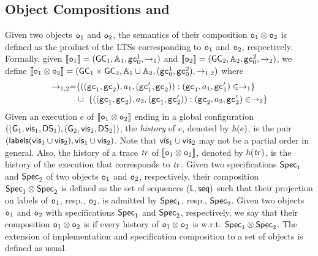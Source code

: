 \subsection{Object Compositions and \CRDTLin{}}

Given two objects $\mathtt{o}_1$ and $\mathtt{o}_2$, the semantics of their composition $\mathtt{o}_1\otimes \mathtt{o}_2$ is defined as the product of the LTSs corresponding to $\mathtt{o}_1$ and $\mathtt{o}_2$, respectively. Formally, given $\llbracket \mathtt{o}_1 \rrbracket =(\mathsf{GC}_1,\mathbb{A}_1,\mathtt{gc}_0^1,\rightarrow_1)$ and $\llbracket \mathtt{o}_2 \rrbracket =(\mathsf{GC}_2,\mathbb{A}_2,\mathtt{gc}_0^2,\rightarrow_2)$, we define $\llbracket \mathtt{o}_1\otimes \mathtt{o}_2 \rrbracket =(\mathsf{GC}_1\times \mathsf{GC}_2,\mathbb{A}_1\cup \mathbb{A}_2,(\mathtt{gc}_0^1,\mathtt{gc}_0^2),\rightarrow_{1,2})$ where 
\begin{align*}
\rightarrow_{1,2} = & \{ ((\mathtt{gc}_1,\mathtt{gc}_2),a_1,(\mathtt{gc}_1',\mathtt{gc}_2)): (\mathtt{gc}_1,a_1,\mathtt{gc}_1')\in\rightarrow_1\} \\
& \cup\ \{ ((\mathtt{gc}_1,\mathtt{gc}_2),a_2,(\mathtt{gc}_1,\mathtt{gc}_2')): (\mathtt{gc}_2,a_2,\mathtt{gc}_2')\in\rightarrow_2\}
\end{align*}
Given an execution $e$ of $\llbracket \mathtt{o}_1\otimes \mathtt{o}_2 \rrbracket$ ending in a global configuration $((\mathsf{G}_1,
\mathsf{vis}_1, \mathsf{DS}_1),(\mathsf{G}_2,\mathsf{vis}_2, \mathsf{DS}_2))$, the \emph{history} of $e$, denoted by $\mathit{h}({e)}$, is the pair
$(\mathsf{labels}(\mathsf{vis}_1\cup \mathsf{vis}_2), \mathsf{vis}_1\cup\mathsf{vis}_2)$. Note that $\mathsf{vis}_1\cup\mathsf{vis}_2$ may not be a partial order in general.
Also, the history of a trace $\mathit{tr}$ of $\llbracket \mathtt{o}_1\otimes \mathtt{o}_2 \rrbracket$, denoted by $\mathit{h}({\mathit{tr})}$, is the history of the execution that corresponds to $\mathit{tr}$.
Given two specifications $\mathsf{Spec}_1$ and $\mathsf{Spec}_2$ of two objects $\mathtt{o}_1$ and $\mathtt{o}_2$, respectively, their composition $\mathsf{Spec}_1\otimes \mathsf{Spec}_2$ is defined as the set of sequences $(\mathsf{L},\mathsf{seq})$ such that their projection on labels of $\mathtt{o}_1$, resp., $\mathtt{o}_2$, is admitted by $\mathsf{Spec}_1$, resp., $\mathsf{Spec}_2$. Given two objects  $\mathtt{o}_1$ and $\mathtt{o}_2$ with specifications $\mathsf{Spec}_1$ and $\mathsf{Spec}_2$, respectively, we say that their composition $\mathtt{o}_1\otimes \mathtt{o}_2$ is \emph{\crdtlinearizable{}} if every history of $\mathtt{o}_1\otimes \mathtt{o}_2$ is \crdtlinearizable{} w.r.t. $\mathsf{Spec}_1\otimes \mathsf{Spec}_2$. The extension of implementation and specification composition to a set of objects is defined as usual. 

